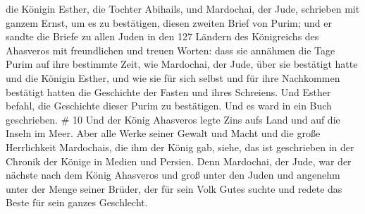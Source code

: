 die Königin Esther, die Tochter Abihails, und Mardochai, der Jude,
schrieben mit ganzem Ernst, um es zu bestätigen, diesen zweiten Brief
von Purim;  und er sandte die Briefe zu allen Juden in
den 127 Ländern des Königreichs des Ahasveros mit freundlichen und
treuen Worten:  dass sie annähmen die Tage Purim auf ihre
bestimmte Zeit, wie Mardochai, der Jude, über sie bestätigt hatte und
die Königin Esther, und wie sie für sich selbst und für ihre Nachkommen
bestätigt hatten die Geschichte der Fasten und ihres Schreiens.
 Und Esther befahl, die Geschichte dieser Purim zu
bestätigen. Und es ward in ein Buch geschrieben. \# 10 
Und der König Ahasveros legte Zins aufs Land und auf die Inseln im Meer.
 Aber alle Werke seiner Gewalt und Macht und die große
Herrlichkeit Mardochais, die ihm der König gab, siehe, das ist
geschrieben in der Chronik der Könige in Medien und Persien.
 Denn Mardochai, der Jude, war der nächste nach dem König
Ahasveros und groß unter den Juden und angenehm unter der Menge seiner
Brüder, der für sein Volk Gutes suchte und redete das Beste für sein
ganzes Geschlecht.
